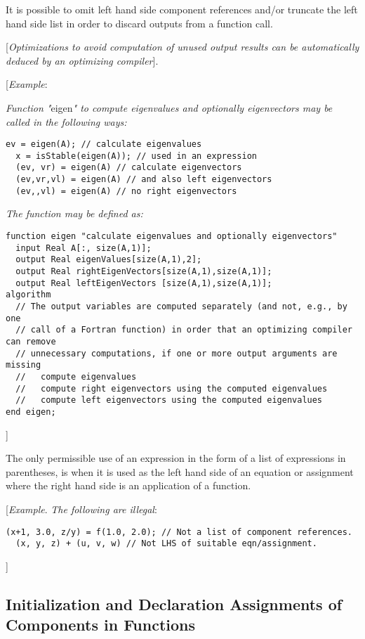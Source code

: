 It is possible to omit left hand side component references and/or
truncate the left hand side list in order to discard outputs from a
function call.

{[}\emph{Optimizations to avoid computation of unused output results can
be automatically deduced by an optimizing compiler}{]}.

{[}\emph{Example}:

\emph{Function "}eigen\emph{" to compute eigenvalues and optionally
eigenvectors may be called in the following ways:}

\begin{lstlisting}[language=modelica]
  ev = eigen(A); // calculate eigenvalues
  x = isStable(eigen(A)); // used in an expression
  (ev, vr) = eigen(A) // calculate eigenvectors
  (ev,vr,vl) = eigen(A) // and also left eigenvectors
  (ev,,vl) = eigen(A) // no right eigenvectors
\end{lstlisting}
\emph{The function may be defined as:}

\begin{lstlisting}[language=modelica]
function eigen "calculate eigenvalues and optionally eigenvectors"
  input Real A[:, size(A,1)];
  output Real eigenValues[size(A,1),2];
  output Real rightEigenVectors[size(A,1),size(A,1)];
  output Real leftEigenVectors [size(A,1),size(A,1)];
algorithm
  // The output variables are computed separately (and not, e.g., by one
  // call of a Fortran function) in order that an optimizing compiler can remove
  // unnecessary computations, if one or more output arguments are missing
  //   compute eigenvalues
  //   compute right eigenvectors using the computed eigenvalues
  //   compute left eigenvectors using the computed eigenvalues
end eigen;
\end{lstlisting}
{]}

The only permissible use of an expression in the form of a list of
expressions in parentheses, is when it is used as the left hand side of
an equation or assignment where the right hand side is an application of
a function.

{[}\emph{Example}. \emph{The following are illegal}:

\begin{lstlisting}[language=modelica]
  (x+1, 3.0, z/y) = f(1.0, 2.0); // Not a list of component references.
  (x, y, z) + (u, v, w) // Not LHS of suitable eqn/assignment.
\end{lstlisting}
{]}

\subsection{Initialization and Declaration Assignments of Components in Functions}

